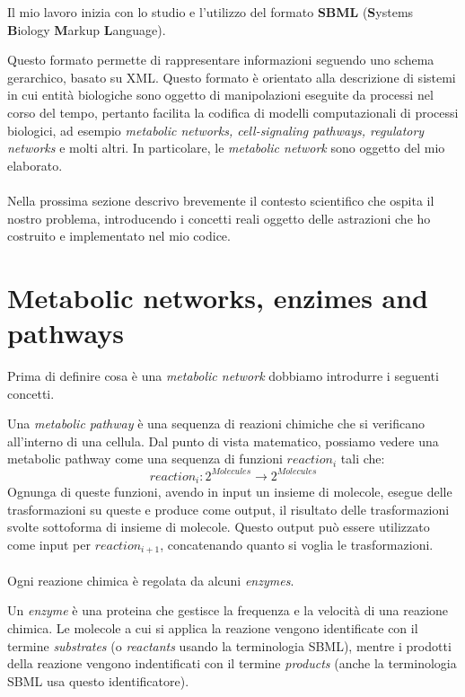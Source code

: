 
Il mio lavoro inizia con lo studio e l'utilizzo del formato
\textbf{SBML} (\textbf{S}ystems \textbf{B}iology \textbf{M}arkup 
\textbf{L}anguage). 

Questo formato permette di rappresentare informazioni seguendo uno
schema gerarchico, basato su XML. Questo formato \`e orientato alla
descrizione di sistemi in cui entit\`a biologiche sono oggetto di
manipolazioni eseguite da processi nel corso del tempo, pertanto
facilita la codifica di modelli computazionali di processi biologici,
ad esempio \emph{metabolic networks, cell-signaling pathways,
  regulatory networks} e molti altri. In particolare, le
\emph{metabolic network} sono oggetto del mio elaborato.
\\\\
Nella prossima sezione descrivo brevemente il contesto scientifico che
ospita il nostro problema, introducendo i concetti reali oggetto delle
astrazioni che ho costruito e implementato nel mio codice.

\section{Metabolic networks, enzimes and pathways}

Prima di definire cosa \`e una \emph{metabolic network} dobbiamo
introdurre i seguenti concetti.

Una \emph{metabolic pathway} \`e una sequenza di reazioni chimiche che
si verificano all'interno di una cellula. Dal punto di vista
matematico, possiamo vedere una metabolic pathway come una sequenza di
funzioni $reaction_{i}$ tali che:
\begin{displaymath}
reaction_{i} : 2^{Molecules} \rightarrow 2^{Molecules}
\end{displaymath}
Ognunga di queste funzioni, avendo in input un insieme di molecole,
esegue delle trasformazioni su queste e produce come output, il
risultato delle trasformazioni svolte sottoforma di insieme di
molecole. Questo output pu\`o essere utilizzato come input per
$reaction_{i+1}$, concatenando quanto si voglia le trasformazioni.
\\\\
Ogni reazione chimica \`e regolata da alcuni \emph{enzymes}.

Un \emph{enzyme} \`e una proteina che gestisce la frequenza e la
velocit\`a di una reazione chimica. Le molecole a cui si applica la
reazione vengono identificate con il termine \emph{substrates} (o
\emph{reactants} usando la terminologia SBML), mentre i prodotti della
reazione vengono indentificati con il termine \emph{products} (anche la
terminologia SBML usa questo identificatore).

